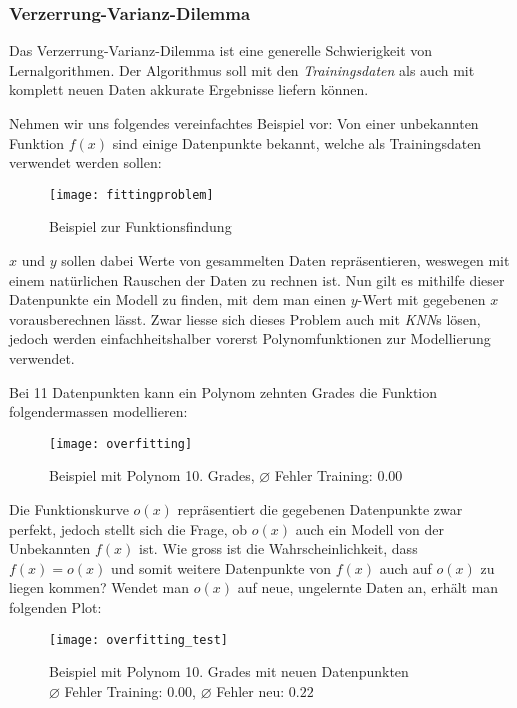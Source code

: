 \subsubsection{Verzerrung-Varianz-Dilemma \cite{bias}}\label{cha:theo:ml:b-v}
Das Verzerrung-Varianz-Dilemma ist eine generelle Schwierigkeit von Lernalgorithmen. Der Algorithmus soll mit den \textit{Trainingsdaten} als auch mit komplett neuen Daten akkurate Ergebnisse liefern können.

Nehmen wir uns folgendes vereinfachtes Beispiel vor: Von einer unbekannten Funktion $f(x)$ sind einige Datenpunkte bekannt, welche als Trainingsdaten verwendet werden sollen:

\begin{figure}[h]
	\centering
	\texttt{[image: fittingproblem]}
	\caption[Beispiel zur Funktionsfindung]{Beispiel zur Funktionsfindung}
\end{figure}

$x$ und $y$ sollen dabei Werte von gesammelten Daten repräsentieren, weswegen mit einem natürlichen Rauschen der Daten zu rechnen ist. Nun gilt es mithilfe dieser Datenpunkte ein Modell zu finden, mit dem man einen $y$-Wert mit gegebenen $x$ vorausberechnen lässt. Zwar liesse sich dieses Problem auch mit \textit{KNN}s lösen, jedoch werden einfachheitshalber vorerst Polynomfunktionen zur Modellierung verwendet.

Bei 11 Datenpunkten kann ein Polynom zehnten Grades die Funktion folgendermassen modellieren:

\begin{figure}[h]
	\centering
	\texttt{[image: overfitting]}
	\caption[Beispiel mit Polynom 10. Grades]{Beispiel mit Polynom 10. Grades,  $\diameter$ Fehler Training: $0.00$}
\end{figure}

Die Funktionskurve $o(x)$ repräsentiert die gegebenen Datenpunkte zwar perfekt, jedoch stellt sich die Frage, ob  $o(x)$ auch ein Modell von der Unbekannten $f(x)$ ist. Wie gross ist die Wahrscheinlichkeit, dass $f(x) = o(x)$ und somit weitere Datenpunkte von $f(x)$ auch auf $o(x)$ zu liegen kommen? Wendet man $o(x)$ auf neue, ungelernte Daten an, erhält man folgenden Plot:

\begin{figure}[h]
	\centering
	\texttt{[image: overfitting\_test]}
	\caption[Beispiel mit Polynom 10. Grades mit neuen Datenpunkten]{Beispiel mit Polynom 10. Grades mit neuen Datenpunkten\\ $\diameter$ Fehler Training: $0.00$, $\diameter$ Fehler neu: $0.22$}
\end{figure}

